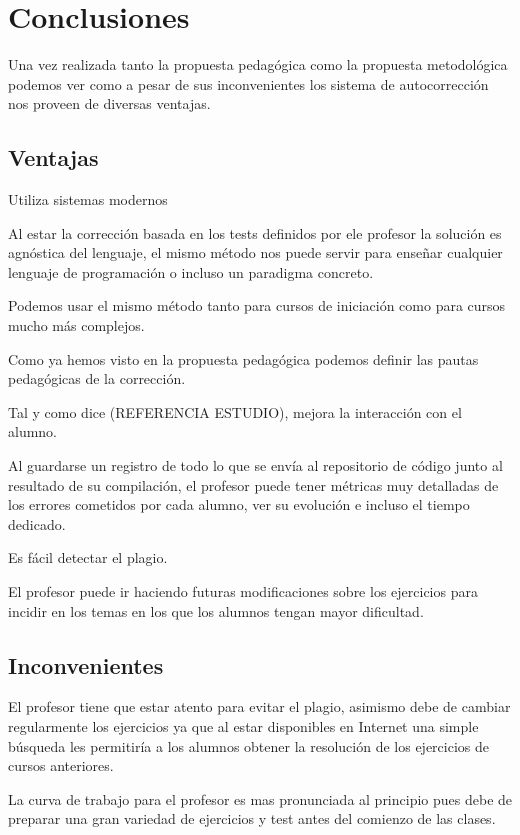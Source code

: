\chapter{Conclusiones}

Una vez realizada tanto la propuesta pedagógica como la propuesta metodológica podemos ver como a pesar de sus inconvenientes los sistema de autocorrección nos proveen de diversas ventajas.

\section{Ventajas}

Utiliza sistemas modernos

Al estar la corrección basada en los tests definidos por ele profesor la solución es agnóstica del lenguaje, el mismo método nos puede servir para enseñar cualquier lenguaje de programación o incluso un paradigma concreto.

Podemos usar el mismo método tanto para cursos de iniciación como para cursos mucho más complejos.

Como ya hemos visto en la propuesta pedagógica podemos definir las pautas pedagógicas de la corrección.

Tal y como dice (REFERENCIA ESTUDIO), mejora la interacción con el alumno.

Al guardarse un registro de todo lo que se envía al repositorio de código junto al resultado de su compilación, el profesor puede tener métricas muy detalladas de los errores cometidos por cada alumno, ver su evolución e incluso el tiempo dedicado.

Es fácil detectar el plagio.

El profesor puede ir haciendo futuras modificaciones sobre los ejercicios para incidir en los temas en los que los alumnos tengan mayor dificultad.


\section{Inconvenientes}

El profesor tiene que estar atento para evitar el plagio, asimismo debe de cambiar regularmente los ejercicios ya que al estar disponibles en Internet una simple búsqueda les permitiría a los alumnos obtener la resolución de los ejercicios de cursos anteriores.

La curva de trabajo para el profesor es mas pronunciada al principio pues debe de preparar una gran variedad de ejercicios y test antes del comienzo de las clases.



